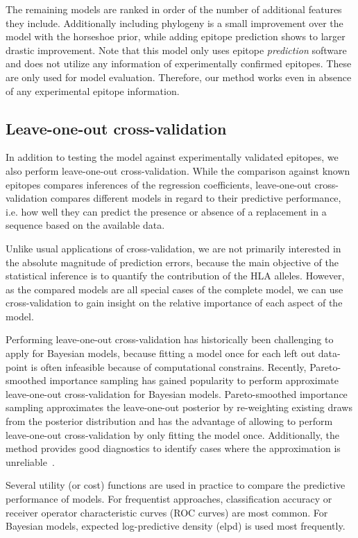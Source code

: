 \documentclass[fleqn,11pt]{SelfArx} %
\begin{document}
The remaining models are ranked in order of the number of additional features they include. Additionally including phylogeny is a small improvement over the model with the horseshoe prior, while adding epitope prediction shows to larger drastic improvement.
Note that this model only uses epitope \textit{prediction} software and does not utilize any information of experimentally confirmed epitopes. These are only used for model evaluation. Therefore, our method works even in absence of any experimental epitope information.

\subsection{Leave-one-out cross-validation}

In addition to testing the model against experimentally validated epitopes, we also perform leave-one-out cross-validation. While the comparison against known epitopes compares inferences of the regression coefficients, leave-one-out cross-validation compares different models in regard to their predictive performance, i.e. how well they can predict the presence or absence of a replacement in a sequence based on the available data.

Unlike usual applications of cross-validation, we are not primarily interested in the absolute magnitude of prediction errors, because the main objective of the statistical inference is to quantify the contribution of the HLA alleles.
However, as the compared models are all special cases of the complete model, we can use cross-validation to gain insight on the relative importance of each aspect of the model.

Performing leave-one-out cross-validation has historically been challenging to apply for Bayesian models, because fitting a model once for each left out data-point is often infeasible because of computational constrains.
Recently, Pareto-smoothed importance sampling has gained popularity to perform approximate leave-one-out cross-validation for Bayesian models. Pareto-smoothed importance sampling approximates the leave-one-out posterior by re-weighting existing draws from the posterior distribution and has the advantage of allowing to perform leave-one-out cross-validation by only fitting the model once. Additionally, the method provides good diagnostics to identify cases where the approximation is unreliable~\cite{Vehtari2016}.

Several utility (or cost) functions are used in practice to compare the predictive performance of models. For frequentist approaches, classification accuracy or receiver operator characteristic curves (ROC curves) are most common.
For Bayesian models, expected log-predictive density (elpd) is used most frequently. 
\end{document}
